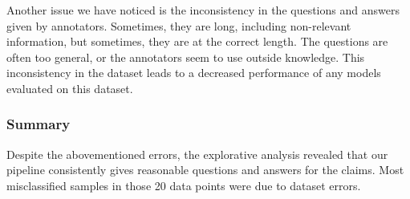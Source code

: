 Another issue we have noticed is the inconsistency in the questions and answers given by annotators. Sometimes, they are long, including non-relevant information, but sometimes, they are at the correct length. The questions are often too general, or the annotators seem to use outside knowledge. This inconsistency in the dataset leads to a decreased performance of any models evaluated on this dataset.

\subsubsection{Summary}
Despite the abovementioned errors, the explorative analysis revealed that our pipeline consistently gives reasonable questions and answers for the claims. Most misclassified samples in those 20 data points were due to dataset errors.

